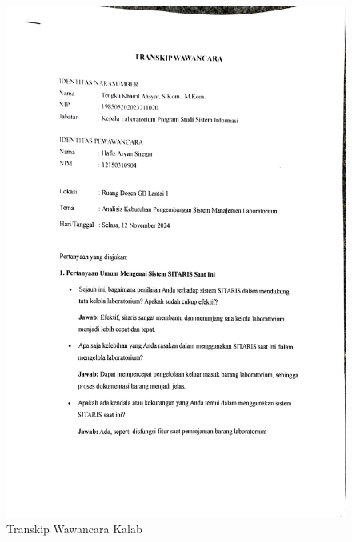 \begin{figure}[h]
	\centering
	\includegraphics[width=0.82\linewidth]{konten/gambar/wawancara/wawancara_1.jpg}
	\caption{Transkip Wawancara Kalab}
	\label{fig:hasil-wawancara}
\end{figure}
